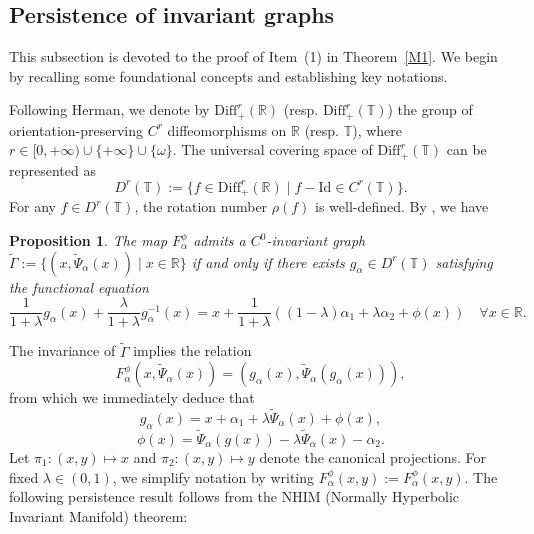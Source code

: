 \documentclass{amsart}
\newcommand{\al}{\alpha}
\newtheorem{Proposition}[Definition]{Proposition}
\theoremstyle{definition}
\begin{document}
\subsection{Persistence of invariant graphs}
This subsection is devoted to the proof of Item~(1) in Theorem~\ref{M1}. We begin by recalling some foundational concepts and establishing key notations.

Following Herman, we denote by $\mathrm{Diff}^r_+(\mathbb{R})$ (resp. $\mathrm{Diff}^r_+(\mathbb{T})$) the group of orientation-preserving $C^r$ diffeomorphisms on $\mathbb{R}$ (resp. $\mathbb{T}$), where $r \in [0,+\infty) \cup \{+\infty\} \cup \{\omega\}$. The universal covering space of $\mathrm{Diff}^r_+(\mathbb{T})$ can be represented as
\[
D^r(\mathbb{T}) := \{f \in \mathrm{Diff}^r_+(\mathbb{R}) \mid f - \mathrm{Id} \in C^r(\mathbb{T})\}.
\]
For any $f \in D^r(\mathbb{T})$, the rotation number $\rho(f)$ is well-defined. By \cite[Proposition 2.1]{SoW}, we have

\begin{Proposition}\label{hf1}
The map $F^\phi_{\al}$ admits a $C^0$-invariant graph $\tilde{\Gamma} := \{(x, \tilde{\Psi}_{\alpha}(x)) \mid x \in \mathbb{R}\}$ if and only if there exists $g_{\alpha} \in D^r(\mathbb{T})$ satisfying the functional equation
\begin{equation}\tag{A}\label{eq:main}
\frac{1}{1+\lambda}g_{\alpha}(x) + \frac{\lambda}{1+\lambda}g_{\alpha}^{-1}(x) = x + \frac{1}{1+\lambda}\left((1-\lambda)\alpha_1 + \lambda\alpha_2 + \phi(x)\right) \quad \forall x \in \mathbb{R}.
\end{equation}
\end{Proposition}

The invariance of $\tilde{\Gamma}$ implies the  relation
\begin{equation}\label{finvar}
F^\phi_{\al}(x, \tilde{\Psi}_{\alpha}(x)) = (g_{\alpha}(x), \tilde{\Psi}_{\alpha}(g_{\alpha}(x))),
\end{equation}
from which we immediately deduce that
\begin{equation}\label{xw2}
g_{\alpha}(x) = x + \alpha_1 + \lambda\tilde{\Psi}_{\alpha}(x)+\phi(x),
\end{equation}
\begin{equation}\label{psss}
\phi(x)=\tilde{\Psi}_\al(g(x))-\lambda\tilde{\Psi}_\al(x)-\al_2.
\end{equation}
Let $\pi_1: (x,y) \mapsto x$ and $\pi_2: (x,y) \mapsto y$ denote the canonical projections. For fixed $\lambda \in (0,1)$, we simplify notation by writing $F^{\phi}_\alpha(x,y) := F^{\phi}_{\al}(x,y)$. The following persistence result follows from the NHIM (Normally Hyperbolic Invariant Manifold) theorem:
\end{document}

